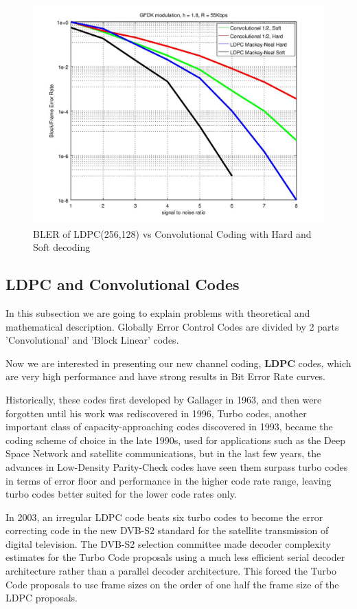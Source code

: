 \begin{figure}[h]
\centering
\includegraphics[scale=0.6]{Figures/LDPC_Conv_final.jpg}
\caption{BLER of LDPC(256,128) vs Convolutional Coding with Hard and Soft decoding}
\label{LDPC_Conv_final}
\end{figure}
   
\subsection{LDPC and Convolutional Codes}
In this subsection we are going to explain problems with theoretical and mathematical description.
Globally Error Control Codes are divided by 2 parts 'Convolutional' and 'Block Linear' codes.

Now we are interested in presenting our new channel coding, \textbf{LDPC} codes, which are very high performance and have strong results in Bit Error Rate curves.

Historically, these codes first developed by Gallager in 1963, and then were forgotten until his work was rediscovered in 1996, Turbo codes, another important class of capacity-approaching codes discovered in 1993, became the coding scheme of choice in the late 1990s, used for applications such as the Deep Space Network and satellite communications, but in the last few years, the advances in Low-Density Parity-Check codes have seen them surpass turbo codes in terms of error floor and performance in the higher code rate range, leaving turbo codes better suited for the lower code rates only. 

In 2003, an irregular LDPC code beats six turbo codes to become the error correcting code in the new DVB-S2 standard for the satellite transmission of digital television. The DVB-S2 selection committee made decoder complexity estimates for the Turbo Code proposals using a much less efficient serial decoder architecture rather than a parallel decoder architecture. This forced the Turbo Code proposals to use frame sizes on the order of one half the frame size of the LDPC proposals.

